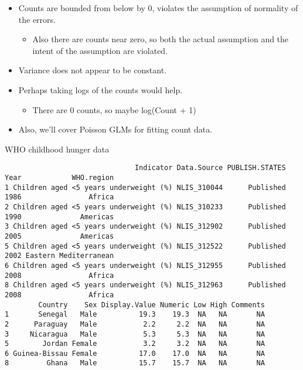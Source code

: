 \documentclass[12pt,]{04-class-files/abntex2}
\newenvironment{Shaded}{\begin{snugshade}}{\end{snugshade}}
\newcommand{\CommentTok}[1]{\textcolor[rgb]{0.56,0.35,0.01}{\textit{#1}}}
\newcommand{\KeywordTok}[1]{\textcolor[rgb]{0.13,0.29,0.53}{\textbf{#1}}}
\newcommand{\NormalTok}[1]{#1}
\newcommand{\OperatorTok}[1]{\textcolor[rgb]{0.81,0.36,0.00}{\textbf{#1}}}
\newcommand{\StringTok}[1]{\textcolor[rgb]{0.31,0.60,0.02}{#1}}
\providecommand{\tightlist}{%
  \setlength{\itemsep}{0pt}\setlength{\parskip}{0pt}}
\begin{document}
\begin{itemize}
\tightlist
\item
  Counts are bounded from below by 0, violates the assumption of normality of the errors.

  \begin{itemize}
  \tightlist
  \item
    Also there are counts near zero, so both the actual assumption and the intent of the assumption are violated.
  \end{itemize}
\item
  Variance does not appear to be constant.
\item
  Perhaps taking logs of the counts would help.

  \begin{itemize}
  \tightlist
  \item
    There are 0 counts, so maybe log(Count + 1)
  \end{itemize}
\item
  Also, we'll cover Poisson GLMs for fitting count data.
\end{itemize}

WHO childhood hunger data

\begin{Shaded}
\end{Shaded}

\begin{verbatim}
                               Indicator Data.Source PUBLISH.STATES Year            WHO.region
1 Children aged <5 years underweight (%) NLIS_310044      Published 1986                Africa
2 Children aged <5 years underweight (%) NLIS_310233      Published 1990              Americas
3 Children aged <5 years underweight (%) NLIS_312902      Published 2005              Americas
5 Children aged <5 years underweight (%) NLIS_312522      Published 2002 Eastern Mediterranean
6 Children aged <5 years underweight (%) NLIS_312955      Published 2008                Africa
8 Children aged <5 years underweight (%) NLIS_312963      Published 2008                Africa
        Country    Sex Display.Value Numeric Low High Comments
1       Senegal   Male          19.3    19.3  NA   NA       NA
2      Paraguay   Male           2.2     2.2  NA   NA       NA
3     Nicaragua   Male           5.3     5.3  NA   NA       NA
5        Jordan Female           3.2     3.2  NA   NA       NA
6 Guinea-Bissau Female          17.0    17.0  NA   NA       NA
8         Ghana   Male          15.7    15.7  NA   NA       NA
\end{verbatim}
\end{document}
